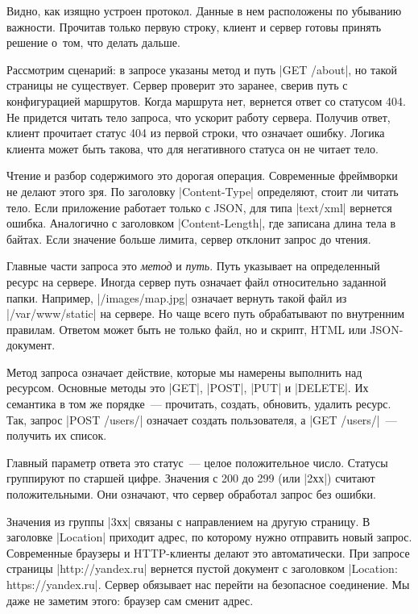 Видно, как изящно устроен протокол. Данные в нем расположены по убыванию важности.
Прочитав только первую строку, клиент и сервер готовы принять решение о~том,
что делать дальше.

Рассмотрим сценарий: в запросе указаны метод и путь \spverb|GET /about|, но
такой страницы не существует. Сервер проверит это заранее, сверив путь с
конфигурацией маршрутов. Когда маршрута нет, вернется ответ со статусом 404. Не
придется читать тело запроса, что ускорит работу сервера. Получив ответ, клиент
прочитает статус 404 из первой строки, что означает ошибку. Логика клиента может
быть такова, что для негативного статуса он не читает тело.

Чтение и разбор содержимого это дорогая операция. Современные фреймворки не
делают этого зря. По заголовку \spverb|Content-Type| определяют, стоит ли читать
тело. Если приложение работает только с JSON, для типа \spverb|text/xml|
вернется ошибка. Аналогично с заголовком \spverb|Content-Length|, где записана
длина тела в байтах. Если значение больше лимита, сервер отклонит запрос до
чтения.

Главные части запроса это \emph{метод} и \emph{путь}. Путь указывает на
определенный ресурс на сервере. Иногда сервер путь означает файл относительно
заданной папки. Например, \spverb|/images/map.jpg| означает вернуть такой файл
из \spverb|/var/www/static| на сервере. Но чаще всего путь обрабатывают по
внутренним правилам. Ответом может быть не только файл, но и скрипт, HTML или
JSON-документ.

Метод запроса означает действие, которые мы намерены выполнить над
ресурсом. Основные методы это \spverb|GET|, \spverb|POST|, \spverb|PUT| и
\spverb|DELETE|. Их семантика в том же порядке~--- прочитать, создать, обновить,
удалить ресурс. Так, запрос \spverb|POST /users/| означает создать пользователя,
а \spverb|GET /users/|~--- получить их список.

Главный параметр ответа это статус~--- целое положительное число. Статусы
группируют по старшей цифре. Значения с 200 до 299 (или \spverb|2хх|) считают
положительными. Они означают, что сервер обработал запрос без ошибки.

Значения из группы \spverb|3хх| связаны с направлением на другую страницу.  В
заголовке \spverb|Location| приходит адрес, по которому нужно отправить новый
запрос. Современные браузеры и HTTP-клиенты делают это автоматически. При
запросе страницы \spverb|http://yandex.ru| вернется пустой документ с заголовком
\spverb|Location: https://yandex.ru|. Сервер обязывает нас перейти на безопасное
соединение. Мы даже не заметим этого: браузер сам сменит адрес.

